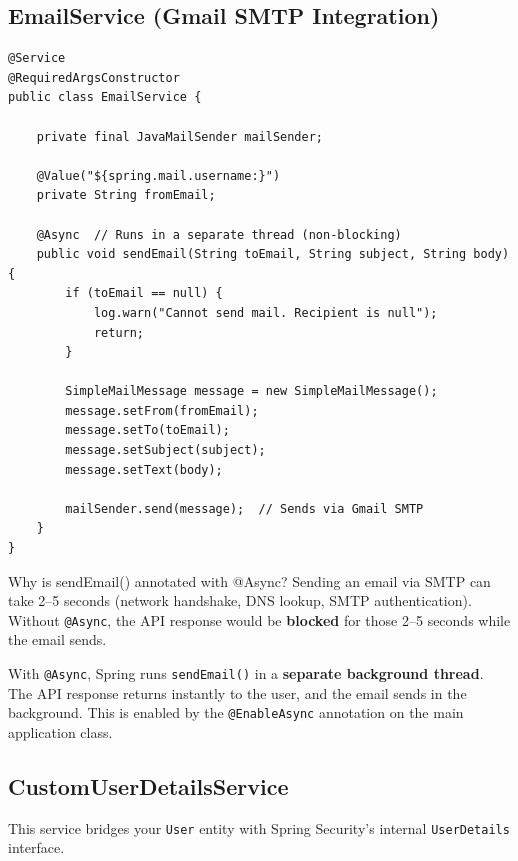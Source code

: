 \documentclass[11pt, a4paper]{article}
\begin{document}
\subsection{EmailService (Gmail SMTP Integration)}

\begin{lstlisting}[caption={EmailService.java -- Asynchronous Email Sending}]
@Service
@RequiredArgsConstructor
public class EmailService {

    private final JavaMailSender mailSender;

    @Value("${spring.mail.username:}")
    private String fromEmail;

    @Async  // Runs in a separate thread (non-blocking)
    public void sendEmail(String toEmail, String subject, String body) {
        if (toEmail == null) {
            log.warn("Cannot send mail. Recipient is null");
            return;
        }

        SimpleMailMessage message = new SimpleMailMessage();
        message.setFrom(fromEmail);
        message.setTo(toEmail);
        message.setSubject(subject);
        message.setText(body);

        mailSender.send(message);  // Sends via Gmail SMTP
    }
}
\end{lstlisting}

\begin{interviewbox}{Why is sendEmail() annotated with @Async?}
Sending an email via SMTP can take 2--5 seconds (network handshake, DNS lookup, SMTP authentication). Without \texttt{@Async}, the API response would be \textbf{blocked} for those 2--5 seconds while the email sends.

With \texttt{@Async}, Spring runs \texttt{sendEmail()} in a \textbf{separate background thread}. The API response returns instantly to the user, and the email sends in the background. This is enabled by the \texttt{@EnableAsync} annotation on the main application class.
\end{interviewbox}

\subsection{CustomUserDetailsService}

This service bridges your \texttt{User} entity with Spring Security's internal \texttt{UserDetails} interface.
\end{document}
